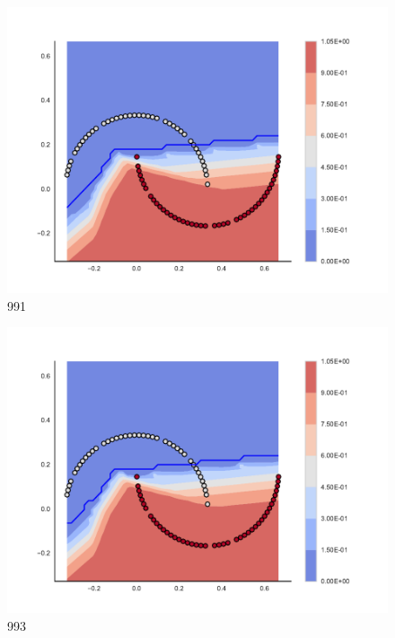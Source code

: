 \begin{subfigure}[b]{0.09\textwidth}
    \includegraphics[clip, trim=2.35cm 1.75cm 4.5cm 0cm,width=\textwidth]{img/convergence/991.pdf}
    \caption{991}
    \label{fig:convergence_991}
\end{subfigure}
%
\begin{subfigure}[b]{0.09\textwidth}
    \includegraphics[clip, trim=2.35cm 1.75cm 4.5cm 0cm,width=\textwidth]{img/convergence/993.pdf}
    \caption{993}
    \label{fig:convergence_993}
\end{subfigure}
%
